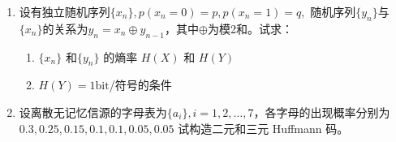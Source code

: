 \documentclass[a4paper]{article}
\begin{document}
\begin{enumerate}[label=\thehwcnt.\arabic*.]
\item 设有独立随机序列$\{x_n\},p(x_n = 0) = p,p(x_n = 1)=q,$ 随机序列$\{y_n\}$与$\{x_n\}$的关系为$y_n = x_n \oplus y_{n-1}$，其中$\oplus$为模2和。试求：
\begin{enumerate}[label=(\arabic*)]
\item $\{x_n\}$ 和$\{y_n\}$ 的熵率 $H(X)$ 和 $H(Y)$
\item $H(Y)= 1\mathrm{bit}$/符号的条件
\end{enumerate}
\item 设离散无记忆信源的字母表为$\{a_i\},i=1,2,\dots,7$，各字母的出现概率分别为 $0.3,0.25,0.15,0.1,0.1,0.05,0.05$ 试构造二元和三元 Huffmann 码。
\begin{solution}


\end{solution}
\end{enumerate}
\end{document}

